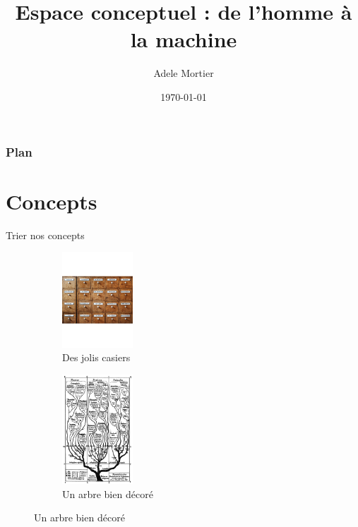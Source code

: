 \documentclass[xcolor=table, hyperref={pdfpagelabels=false}]{beamer}
\title{Espace conceptuel : de l'homme à la machine}
\author{Adele Mortier}
\date{\today}
\begin{document}
\begin{frame}
\titlepage
\end{frame} 


\begin{frame}
\frametitle{Plan}
\tableofcontents
\end{frame} 
\section{Concepts}
\begin{frame}{Trier nos concepts}
	\begin{figure}
		\centering
		\begin{subfigure}[b]{.45\textwidth}
			\centering
			\includegraphics[width=100px]{./images/casiers.jpg}
			\caption{Des jolis casiers}
		\end{subfigure}\pause
		\begin{subfigure}[b]{.45\textwidth}
			\centering
			\includegraphics[width=100px]{./images/tree.png}
			\caption{Un arbre bien décoré}
		\end{subfigure}
	\end{figure}
\end{frame}
\end{document}
